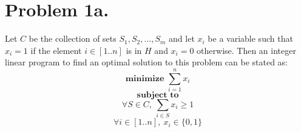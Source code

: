 \documentclass[12pt]{article}
\begin{document}
\pagestyle{plain}
\titleformat{\subsection}[runin]
  {\normalfont\large\bfseries}{\thesubsection}{1em}{}
\titleformat{\subsubsection}[runin]
  {\normalfont\large\bfseries}{\thesubsubsection}{1em}{}

\section*{Problem 1a.}
Let $C$ be the collection of sets $S_1, S_2, ...,S_m$ and let $x_i$ be a
variable such that $x_i = 1$ if the element $i \in [1..n]$ is in $H$ and
$x_i = 0$ otherwise. Then an integer linear program to find an optimal solution
to this problem can be stated as:
$$ \textbf{minimize } \sum_{i=1}^n x_i $$
$$ \textbf{ subject to } $$
$$ \forall S \in C,\ \sum_{i \in S} x_i \ge 1 $$
$$ \forall i \in [1..n],\ x_i \in \{0,1\} $$
\end{document}
